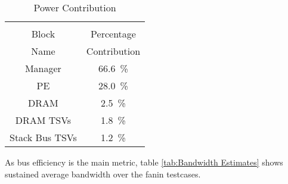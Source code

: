 \begin{table}[h]
\begin{subtable}{0.75\textwidth}
    \label{tab:Power Dissipation}
  \end{subtable}
  \bigskip
  \begin{subtable}{0.75\textwidth}
    \centering
    \begin{adjustbox}{width=0.55\textwidth}
      \begin{tabular}{cc}
        \toprule
                         &                                          \\  %
            Block        & Percentage                               \\  %
            Name         & Contribution                             \\  %
        \hline  %
                Manager  & \SI[per-mode=symbol]{66.6}{\percent}  \\ 
                     PE  & \SI[per-mode=symbol]{28.0}{\percent}  \\
                   DRAM  & \SI[per-mode=symbol]{ 2.5}{\percent}  \\
              DRAM TSVs  & \SI[per-mode=symbol]{ 1.8}{\percent}  \\
         Stack Bus TSVs  & \SI[per-mode=symbol]{ 1.2}{\percent}  \\
        \bottomrule
      \end{tabular}
    \end{adjustbox}
    \vspace{3pt}
    \captionsetup{justification=centering, skip=10pt}
    \caption{Power Contribution}
    \label{tab:Power Dissipation}
  \end{subtable}
  \end{table}

As bus efficiency is the main metric, table \ref{tab:Bandwidth Estimates} shows sustained average bandwidth over the fanin testcases.

